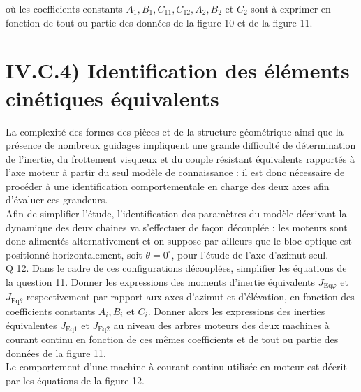 \documentclass[10pt]{article}
\begin{document}
où les coefficients constants $A_{1}, B_{1}, C_{11}, C_{12}, A_{2}, B_{2}$ et $C_{2}$ sont à exprimer en fonction de tout ou partie des données de la figure 10 et de la figure 11.

\section*{IV.C.4) Identification des éléments cinétiques équivalents}
La complexité des formes des pièces et de la structure géométrique ainsi que la présence de nombreux guidages impliquent une grande difficulté de détermination de l'inertie, du frottement visqueux et du couple résistant équivalents rapportés à l'axe moteur à partir du seul modèle de connaissance : il est donc nécessaire de procéder à une identification comportementale en charge des deux axes afin d'évaluer ces grandeurs.\\
Afin de simplifier l'étude, l'identification des paramètres du modèle décrivant la dynamique des deux chaines va s'effectuer de façon découplée : les moteurs sont donc alimentés alternativement et on suppose par ailleurs que le bloc optique est positionné horizontalement, soit $\theta=0^{\circ}$, pour l'étude de l'axe d'azimut seul.\\
Q 12. Dans le cadre de ces configurations découplées, simplifier les équations de la question 11. Donner les expressions des moments d'inertie équivalents $J_{\mathrm{Eq} \varphi}$ et $J_{\mathrm{Eq} \theta}$ respectivement par rapport aux axes d'azimut et d'élévation, en fonction des coefficients constants $A_{i}, B_{i}$ et $C_{i}$. Donner alors les expressions des inerties équivalentes $J_{\mathrm{Eq} 1}$ et $J_{\mathrm{Eq} 2}$ au niveau des arbres moteurs des deux machines à courant continu en fonction de ces mêmes coefficients et de tout ou partie des données de la figure 11.\\
Le comportement d'une machine à courant continu utilisée en moteur est décrit par les équations de la figure 12.
\end{document}
